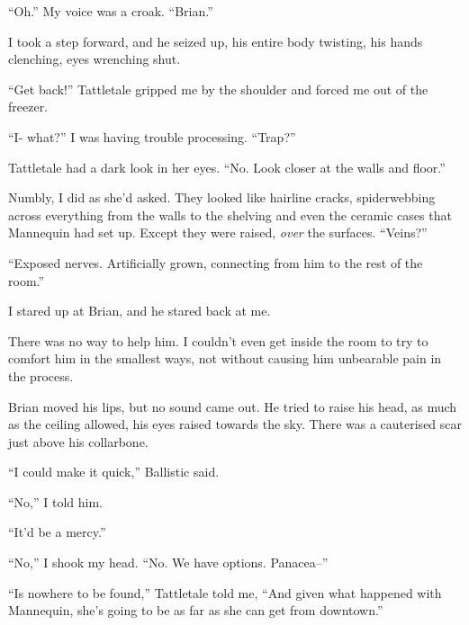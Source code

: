 ``Oh.''  My voice was a croak.  ``Brian.''



I took a step forward, and he seized up, his entire body twisting, his hands clenching, eyes wrenching shut.



``Get back!'' Tattletale gripped me by the shoulder and forced me out of the freezer.



``I- what?''  I was having trouble processing.  ``Trap?''



Tattletale had a dark look in her eyes.  ``No.  Look closer at the walls and floor.''



Numbly, I did as she'd asked.  They looked like hairline cracks, spiderwebbing across everything from the walls to the shelving and even the ceramic cases that Mannequin had set up.  Except they were raised, \emph{over} the surfaces.  ``Veins?''



``Exposed nerves.  Artificially grown, connecting from him to the rest of the room.''



I stared up at Brian, and he stared back at me.



There was no way to help him.  I couldn't even get inside the room to try to comfort him in the smallest ways, not without causing him unbearable pain in the process.



Brian moved his lips, but no sound came out.  He tried to raise his head, as much as the ceiling allowed, his eyes raised towards the sky.  There was a cauterised scar just above his collarbone.



``I could make it quick,'' Ballistic said.



``No,'' I told him.



``It'd be a mercy.''



``No,'' I shook my head.  ``No.  We have options.  Panacea--''



``Is nowhere to be found,'' Tattletale told me, ``And given what happened with Mannequin, she's going to be as far as she can get from downtown.''




